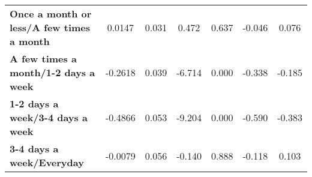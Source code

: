\documentclass{report}
\begin{document}
\begin{center}
\begin{tabular}{lcccccc}
\textbf{Once a month or less/A few times a month} &       0.0147  &        0.031     &     0.472  &         0.637        &       -0.046    &        0.076     \\
\textbf{A few times a month/1-2 days a week}      &      -0.2618  &        0.039     &    -6.714  &         0.000        &       -0.338    &       -0.185     \\
\textbf{1-2 days a week/3-4 days a week}          &      -0.4866  &        0.053     &    -9.204  &         0.000        &       -0.590    &       -0.383     \\
\textbf{3-4 days a week/Everyday}                 &      -0.0079  &        0.056     &    -0.140  &         0.888        &       -0.118    &        0.103     \\
\bottomrule
\end{tabular}
\end{center}
\end{document}
